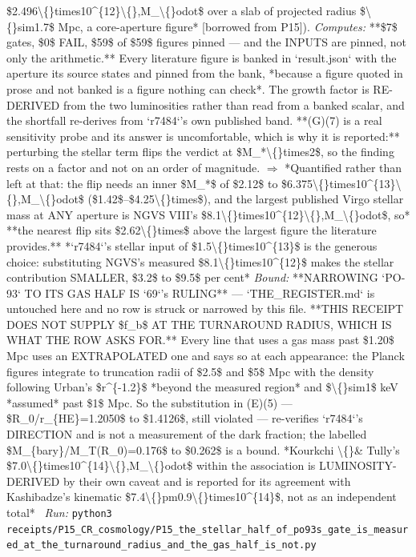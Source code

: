 \begin{description}
\$2.496\textbackslash\{\}times10\textasciicircum{}\{12\}\textbackslash\{\},M\_\textbackslash\{\}odot\$ over a slab of projected radius \$\textbackslash\{\}sim1.7\$ Mpc, a core-aperture figure* [borrowed from P15]). 
\emph{Computes:} **\$7\$ gates, \$0\$ FAIL, \$59\$ of \$59\$ figures pinned --- and the INPUTS are pinned, not only the arithmetic.** Every literature figure is banked in `result.json` with the aperture its source states and pinned from the bank, *because a figure quoted in prose and not banked is a figure nothing can check*. The growth factor is RE-DERIVED from the two luminosities rather than read from a banked scalar, and the shortfall re-derives from `r7484`'s own published band. **(G)(7) is a real sensitivity probe and its answer is uncomfortable, which is why it is reported:** perturbing the stellar term flips the verdict at \$M\_*\textbackslash\{\}times2\$, so the finding rests on a factor and not on an order of magnitude. \ensuremath{\Rightarrow} *Quantified rather than left at that: the flip needs an inner \$M\_*\$ of \$2.12\$ to \$6.375\textbackslash\{\}times10\textasciicircum{}\{13\}\textbackslash\{\},M\_\textbackslash\{\}odot\$ (\$1.42\$--\$4.25\textbackslash\{\}times\$), and the largest published Virgo stellar mass at ANY aperture is NGVS VIII's \$8.1\textbackslash\{\}times10\textasciicircum{}\{12\}\textbackslash\{\},M\_\textbackslash\{\}odot\$, so* **the nearest flip sits \$2.62\textbackslash\{\}times\$ above the largest figure the literature provides.**  *`r7484`'s stellar input of \$1.5\textbackslash\{\}times10\textasciicircum{}\{13\}\$ is the generous choice: substituting NGVS's measured \$8.1\textbackslash\{\}times10\textasciicircum{}\{12\}\$ makes the stellar contribution SMALLER, \$3.2\$ to \$9.5\$ per cent*
 \emph{Bound:}  **NARROWING `PO-93` TO ITS GAS HALF IS `69`'s RULING** --- `THE\_REGISTER.md` is untouched here and no row is struck or narrowed by this file.  **THIS RECEIPT DOES NOT SUPPLY \$f\_b\$ AT THE TURNAROUND RADIUS, WHICH IS WHAT THE ROW ASKS FOR.** Every line that uses a gas mass past \$1.20\$ Mpc uses an EXTRAPOLATED one and says so at each appearance: the Planck figures integrate to truncation radii of \$2.5\$ and \$5\$ Mpc with the density following Urban's \$r\textasciicircum{}\{-1.2\}\$ *beyond the measured region* and \$\textbackslash\{\}sim1\$ keV *assumed* past \$1\$ Mpc. So the substitution in (E)(5) --- \$R\_0/r\_\{HE\}=1.2050\$ to \$1.4126\$, still violated --- re-verifies `r7484`'s DIRECTION and is not a measurement of the dark fraction; the labelled \$M\_\{bary\}/M\_T(R\_0)=0.176\$ to \$0.262\$ is a bound.  *Kourkchi \textbackslash\{\}\& Tully's \$7.0\textbackslash\{\}times10\textasciicircum{}\{14\}\textbackslash\{\},M\_\textbackslash\{\}odot\$ within the association is LUMINOSITY-DERIVED by their own caveat and is reported for its agreement with Kashibadze's kinematic \$7.4\textbackslash\{\}pm0.9\textbackslash\{\}times10\textasciicircum{}\{14\}\$, not as an independent total*
\ \emph{Run:} \texttt{python3 receipts/P15\_CR\_cosmology/P15\_the\_stellar\_half\_of\_po93s\_gate\_is\_measured\_at\_the\_turnaround\_radius\_and\_the\_gas\_half\_is\_not.py}
\end{description}\endgroup
